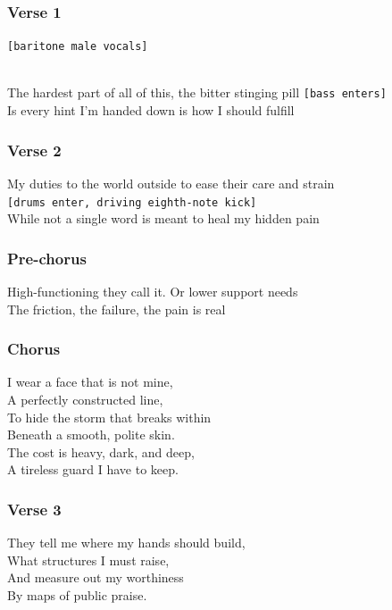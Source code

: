 \documentclass[]{article}
\begin{document}
\subsubsection{Verse 1}\label{verse-1-7}

\texttt{{[}baritone\ male\ vocals{]}}\strut \\
The hardest part of all of this, the bitter stinging pill
\texttt{{[}bass\ enters{]}}\\
Is every hint I'm handed down is how I should fulfill

\subsubsection{Verse 2}\label{verse-2-4}

My duties to the world outside to ease their care and strain
\texttt{{[}drums\ enter,\ driving\ eighth-note\ kick{]}}\\
While not a single word is meant to heal my hidden pain

\subsubsection{Pre-chorus}\label{pre-chorus-7}

High-functioning they call it. Or lower support needs\\
The friction, the failure, the pain is real

\subsubsection{Chorus}\label{chorus-14}

I wear a face that is not mine,\\
A perfectly constructed line,\\
To hide the storm that breaks within\\
Beneath a smooth, polite skin.\\
The cost is heavy, dark, and deep,\\
A tireless guard I have to keep.

\subsubsection{Verse 3}\label{verse-3-4}

They tell me where my hands should build,\\
What structures I must raise,\\
And measure out my worthiness\\
By maps of public praise.
\end{document}
